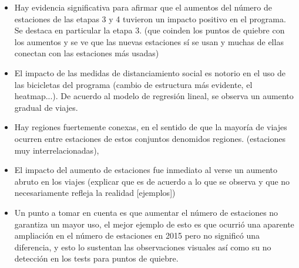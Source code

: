 \documentclass[
]{article}
\begin{document}
\begin{itemize}
\item
  Hay evidencia significativa para afirmar que el aumentos del número de
  estaciones de las etapas 3 y 4 tuvieron un impacto positivo en el
  programa. Se destaca en particular la etapa 3. (que coinden los puntos
  de quiebre con los aumentos y se ve que las nuevas estaciones sí se
  usan y muchas de ellas conectan con las estaciones más usadas)
\item
  El impacto de las medidas de distanciamiento social es notorio en el
  uso de las bicicletas del programa (cambio de estructura más evidente,
  el heatmap...). De acuerdo al modelo de regresión lineal, se observa
  un aumento gradual de viajes.
\item
  Hay regiones fuertemente conexas, en el sentido de que la mayoría de
  viajes ocurren entre estaciones de estos conjuntos denomidos regiones.
  (estaciones muy interrelacionadas),
\item
  El impacto del aumento de estaciones fue inmediato al verse un aumento
  abruto en los viajes (explicar que es de acuerdo a lo que se observa y
  que no necesariamente refleja la realidad {[}ejemplos{]})
\item
  Un punto a tomar en cuenta es que aumentar el número de estaciones no
  garantiza un mayor uso, el mejor ejemplo de esto es que ocurrió una
  aparente ampliación en el número de estaciones en 2015 pero no
  significó una diferencia, y esto lo sustentan las observaciones
  visuales así como su no detección en los tests para puntos de quiebre.
\end{itemize}
\end{document}
